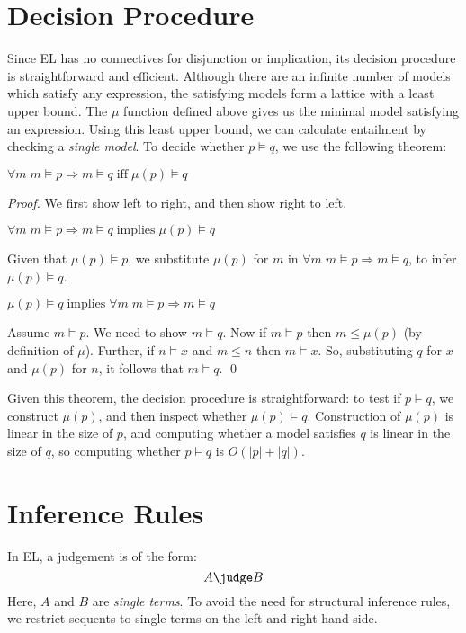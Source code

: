 \section{Decision Procedure}
Since EL has no connectives for disjunction or implication, its decision procedure is straightforward and efficient. 
Although there are an infinite number of models which satisfy any expression, the satisfying models form a lattice with a least upper bound. 
The $\mu$ function defined above gives us the minimal model satisfying an expression.
Using this least upper bound, we can calculate entailment by checking a \emph{single model}.
To decide whether $p \models q$,  we use the following theorem:
\begin{theorem} $\forall m \; m \models p \Rightarrow m \models q \; \text{iff} \; \mu(p) \models q $
\end{theorem}
\begin{proof}
We first show left to right, and then show right to left.
\setcounter{mycase}{0}
\begin{mycase}
$\forall m \; m \models p \Rightarrow m \models q \; \text{implies} \; \mu(p) \models q$
\end{mycase}
Given that $\mu(p) \models p$, we substitute $\mu(p)$ for $m$ in $\forall m \; m \models p \Rightarrow m \models q$, to infer $\mu(p) \models q$.
\begin{mycase}
$\mu(p) \models q \; \text{implies} \; \forall m \; m \models p \Rightarrow m \models q$
\end{mycase}
Assume $m \models p$. We need to show $m \models q$.
Now if $m \models p$ then $m \leq \mu(p)$ (by definition of $\mu$).
Further, if $n \models x$ and $m \leq n$ then $m \models x$. So, substituting $q$ for $x$ and $\mu(p)$ for $n$, it follows that $m \models q$. 
\qed
\end{proof}
Given this theorem, the decision procedure is straightforward: to test if $p \models q$, we construct $\mu(p)$, and then inspect whether $\mu(p) \models q$.
Construction of $\mu(p)$ is linear in the size of $p$, and computing whether a model satisfies $q$ is linear in the size of $q$, so computing whether $p \models q$ is $O(|p|+|q|)$.



\section{Inference Rules}
In EL, a judgement is of the form:
\[
A \judge B
\]
Here, $A$ and $B$ are \emph{single terms}.
To avoid the need for structural inference rules, we restrict sequents to single terms on the left and right hand side.

